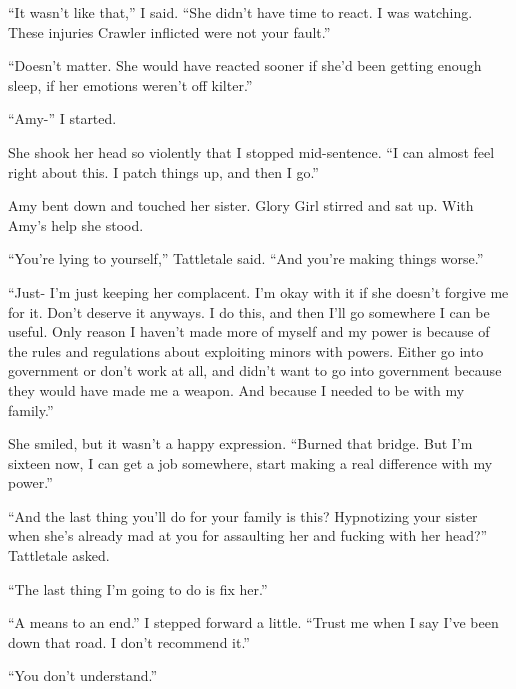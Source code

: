 ``It wasn't like that,'' I said.  ``She didn't have time to react.  I was watching.  These injuries Crawler inflicted were not your fault.''



``Doesn't matter.  She would have reacted sooner if she'd been getting enough sleep, if her emotions weren't off kilter.''



``Amy-'' I started.



She shook her head so violently that I stopped mid-sentence.  ``I can almost feel right about this.  I patch things up, and then I go.''



Amy bent down and touched her sister.  Glory Girl stirred and sat up.  With Amy's help she stood.



``You're lying to yourself,'' Tattletale said.  ``And you're making things worse.''



``Just- I'm just keeping her complacent.  I'm okay with it if she doesn't forgive me for it.  Don't deserve it anyways.  I do this, and then I'll go somewhere I can be useful.  Only reason I haven't made more of myself and my power is because of the rules and regulations about exploiting minors with powers.  Either go into government or don't work at all, and didn't want to go into government because they would have made me a weapon.  And because I needed to be with my family.''



She smiled, but it wasn't a happy expression.  ``Burned that bridge.  But I'm sixteen now, I can get a job somewhere, start making a real difference with my power.''



``And the last thing you'll do for your family is this?  Hypnotizing your sister when she's already mad at you for assaulting her and fucking with her head?''  Tattletale asked.



``The last thing I'm going to do is fix her.''



``A means to an end.''  I stepped forward a little. ``Trust me when I say I've been down that road.  I don't recommend it.''



``You don't understand.''



